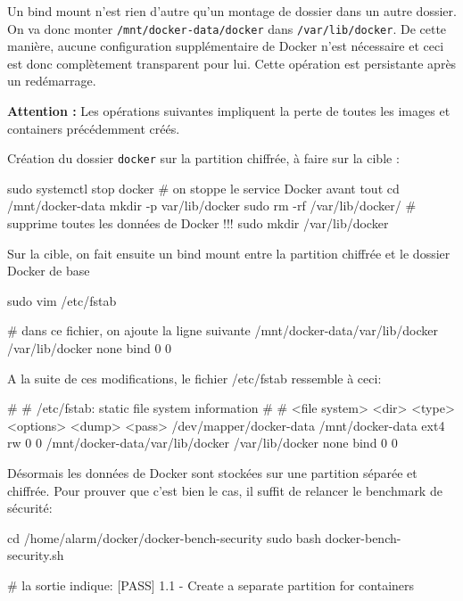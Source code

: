 \documentclass[11pt,a4paper,oneside]{report}
\newcommand{\code}[1]{\texttt{#1}}
\begin{document}
Un bind mount n'est rien d'autre qu'un montage de dossier dans un autre dossier. On va donc monter \code{/mnt/docker-data/docker} dans \code{/var/lib/docker}. De cette manière, aucune configuration supplémentaire de Docker n'est nécessaire et ceci est donc complètement transparent pour lui. Cette opération est persistante après un redémarrage.

\textbf{Attention : } Les opérations suivantes impliquent la perte de toutes les images et containers précédemment créés.

Création du dossier \code{docker} sur la partition chiffrée, à faire sur la cible :
\begin{bashcode}
sudo systemctl stop docker # on stoppe le service Docker avant tout
cd /mnt/docker-data
mkdir -p var/lib/docker
sudo rm -rf /var/lib/docker/ # supprime toutes les données de Docker !!!
sudo mkdir /var/lib/docker
\end{bashcode}

Sur la cible, on fait ensuite un bind mount entre la partition chiffrée et le dossier Docker de base

\begin{bashcode}
sudo vim /etc/fstab

# dans ce fichier, on ajoute la ligne suivante
/mnt/docker-data/var/lib/docker /var/lib/docker none bind 0 0
\end{bashcode}

A la suite de ces modifications, le fichier /etc/fstab ressemble à ceci:
\begin{bashcode}
#
# /etc/fstab: static file system information
#
# <file system> <dir>   <type>  <options>       <dump>  <pass>
/dev/mapper/docker-data /mnt/docker-data ext4 rw 0 0
/mnt/docker-data/var/lib/docker /var/lib/docker none bind 0 0
\end{bashcode}


Désormais les données de Docker sont stockées sur une partition séparée et chiffrée. Pour prouver que c'est bien le cas, il suffit de relancer le benchmark de sécurité:

\begin{bashcode}
cd /home/alarm/docker/docker-bench-security
sudo bash docker-bench-security.sh

# la sortie indique:
[PASS] 1.1  - Create a separate partition for containers
\end{bashcode}
\end{document}
